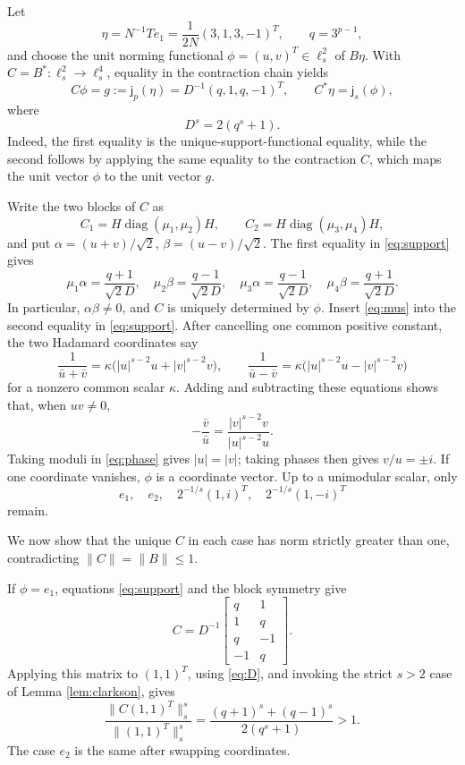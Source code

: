 \documentclass[11pt]{article}
\newcommand{\diag}{\operatorname{diag}}
\newcommand{\jj}{\mathsf j}
\begin{document}
Let
\[
 \eta=N^{-1}Te_1=\frac1{2N}(3,1,3,-1)^T,
 \qquad q=3^{p-1},
\]
and choose the unit norming functional \(\phi=(u,v)^T\in\ell_s^2\) of
\(B\eta\).  With \(C=B^*:\ell_s^2\to\ell_s^4\), equality in the contraction
chain yields
\begin{equation}\label{eq:support}
 C\phi=g:=\jj_p(\eta)=D^{-1}(q,1,q,-1)^T,
 \qquad C^*\eta=\jj_s(\phi),
\end{equation}
where
\begin{equation}\label{eq:D}
 D^s=2(q^s+1).
\end{equation}
Indeed, the first equality is the unique-support-functional equality, while
the second follows by applying the same equality to the contraction \(C\),
which maps the unit vector \(\phi\) to the unit vector \(g\).

Write the two blocks of \(C\) as
\[
 C_1=H\diag(\mu_1,\mu_2)H,\qquad
 C_2=H\diag(\mu_3,\mu_4)H,
\]
and put \(\alpha=(u+v)/\sqrt2\), \(\beta=(u-v)/\sqrt2\).  The first equality
in \eqref{eq:support} gives
\begin{equation}\label{eq:mus}
 \mu_1\alpha=\frac{q+1}{\sqrt2D},\quad
 \mu_2\beta=\frac{q-1}{\sqrt2D},\quad
 \mu_3\alpha=\frac{q-1}{\sqrt2D},\quad
 \mu_4\beta=\frac{q+1}{\sqrt2D}.
\end{equation}
In particular, \(\alpha\beta\ne0\), and \(C\) is uniquely determined by
\(\phi\).  Insert \eqref{eq:mus} into the second equality in
\eqref{eq:support}.  After cancelling one common positive constant, the two
Hadamard coordinates say
\[
 \frac1{\bar u+\bar v}=\kappa\bigl(|u|^{s-2}u+|v|^{s-2}v\bigr),\qquad
 \frac1{\bar u-\bar v}=\kappa\bigl(|u|^{s-2}u-|v|^{s-2}v\bigr)
\]
for a nonzero common scalar \(\kappa\).  Adding and subtracting these equations
shows that, when \(uv\ne0\),
\begin{equation}\label{eq:phase}
 -\frac{\bar v}{\bar u}
 =\frac{|v|^{s-2}v}{|u|^{s-2}u}.
\end{equation}
Taking moduli in \eqref{eq:phase} gives \(|u|=|v|\); taking phases then gives
\(v/u=\pm i\).  If one coordinate vanishes, \(\phi\) is a coordinate vector.
Up to a unimodular scalar, only
\begin{equation}\label{eq:four}
 e_1,\quad e_2,\quad 2^{-1/s}(1,i)^T,\quad 2^{-1/s}(1,-i)^T
\end{equation}
remain.

We now show that the unique \(C\) in each case has norm strictly greater than
one, contradicting \(\|C\|=\|B\|\le1\).

If \(\phi=e_1\), equations \eqref{eq:support} and the block symmetry give
\[
 C=D^{-1}\begin{bmatrix}
 q&1\\1&q\\q&-1\\-1&q
 \end{bmatrix}.
\]
Applying this matrix to \((1,1)^T\), using \eqref{eq:D}, and invoking the
strict \(s>2\) case of Lemma \ref{lem:clarkson}, gives
\[
 \frac{\|C(1,1)^T\|_s^s}{\|(1,1)^T\|_s^s}
 =\frac{(q+1)^s+(q-1)^s}{2(q^s+1)}>1.
\]
The case \(e_2\) is the same after swapping coordinates.
\end{document}
